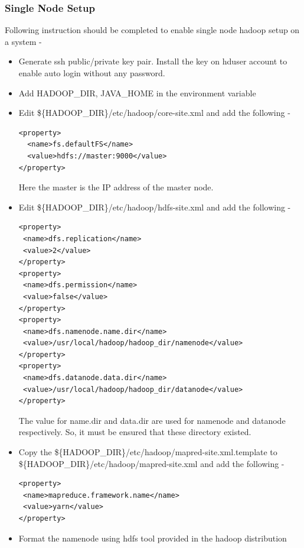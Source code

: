\documentclass{article}
\begin{document}
\subsubsection {Single Node Setup}
Following instruction should be completed to enable single node hadoop setup on a system -
\begin{itemize}
\item Generate ssh public/private key pair. Install the key on hduser account to enable auto login without any password.
\item Add HADOOP\_DIR, JAVA\_HOME in the environment variable
\item Edit \$\{HADOOP\_DIR\}/etc/hadoop/core-site.xml and add the following -\BlankLine
\begin{lstlisting}[caption={Hadoop CoreSite Config},label={lst:coresite},style=MyXMLStyle]
<property>
  <name>fs.defaultFS</name>
  <value>hdfs://master:9000</value>
</property>
\end{lstlisting}
\BlankLine Here the master is the IP address of the master node.
\item Edit \$\{HADOOP\_DIR\}/etc/hadoop/hdfs-site.xml and add the following -\BlankLine
\begin{lstlisting}[caption={Hadoop HDFS Config},label={lst:hdfssite},style=MyXMLStyle]
<property>
 <name>dfs.replication</name>
 <value>2</value>
</property>
<property>
 <name>dfs.permission</name>
 <value>false</value>
</property>
<property>
 <name>dfs.namenode.name.dir</name>
 <value>/usr/local/hadoop/hadoop_dir/namenode</value>
</property>
<property>
 <name>dfs.datanode.data.dir</name>
 <value>/usr/local/hadoop/hadoop_dir/datanode</value>
</property>
\end{lstlisting}
\BlankLine The value for name.dir and data.dir are used for namenode and datanode respectively. So, it must be ensured that these directory existed.

\item Copy the \$\{HADOOP\_DIR\}/etc/hadoop/mapred-site.xml.template to \$\{HADOOP\_DIR\}/etc/hadoop/mapred-site.xml and add the following - \BlankLine
\begin{lstlisting}[caption={Hadoop MapRed Config},label={lst:mapredsite},style=MyXMLStyle]
<property>
 <name>mapreduce.framework.name</name>
 <value>yarn</value>
</property>
\end{lstlisting}
\item Format the namenode using hdfs tool provided in the hadoop distribution
\end{itemize}
\end{document}
